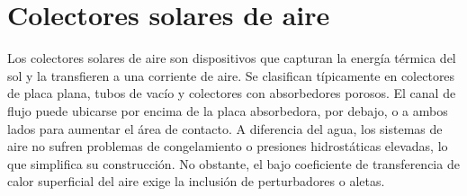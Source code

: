 \section{Colectores solares de aire}
\label{sec:cap02_colectores_solar}

Los colectores solares de aire son dispositivos que capturan la energía térmica del sol y la transfieren a una corriente de aire.
Se clasifican típicamente en colectores de placa plana, tubos de vacío y colectores con absorbedores porosos.
El canal de flujo puede ubicarse por encima de la placa absorbedora, por debajo, o a ambos lados para aumentar el área de contacto.
A diferencia del agua, los sistemas de aire no sufren problemas de congelamiento o presiones hidrostáticas elevadas, lo que simplifica su construcción.
No obstante, el bajo coeficiente de transferencia de calor superficial del aire exige la inclusión de perturbadores o aletas.
